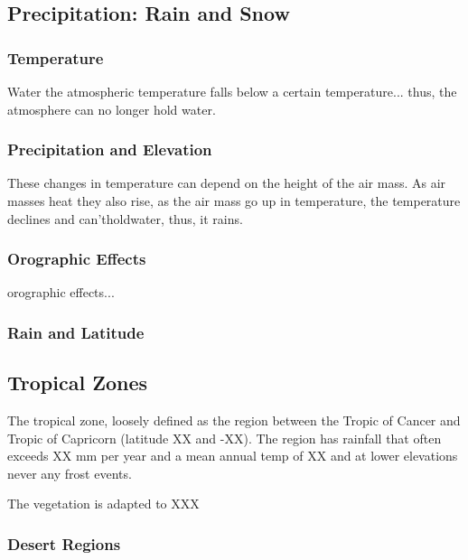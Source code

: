 \subsection{Precipitation: Rain and Snow}

\subsubsection{Temperature}

Water the atmospheric temperature falls below a certain temperature... 
thus, the atmosphere can no longer hold water. 

\subsubsection{Precipitation and Elevation}

These changes in temperature can depend on the height of the air mass. As air masses heat they also rise, as the air mass go up in temperature, the temperature declines and can'tholdwater, thus, it rains.


\subsubsection{Orographic Effects}


\Gls{orographic effects}...

\subsubsection{Rain and Latitude}


\subsection{Tropical Zones}

The tropical zone, loosely defined as the region between the Tropic of Cancer and Tropic of Capricorn (latitude XX and -XX). The region has rainfall that often exceeds XX mm per year and a mean annual temp of XX and at lower elevations never any frost events. 

The vegetation is adapted to XXX 

\subsubsection{Desert Regions}

